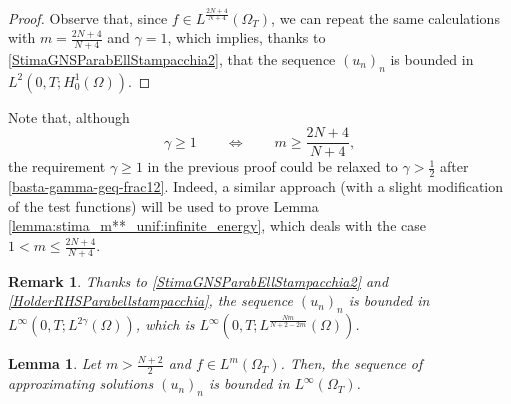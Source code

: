 \documentclass{amsart}
\numberwithin{equation}{section}
\newtheorem{lemma}[example]{Lemma}
\newtheorem{remark}[example]{Remark}
\def\elle#1{L^{#1}}
\def\elleom#1{L^{#1}(\Omega)}
\def\elleomT#1{L^{#1}(\Omega_T)}
\def\Hom{H^1_0(\Omega)}
\begin{document}
\begin{proof}
    Observe that, since $f\in\elleomT{\frac{2N+4}{N+4}}$, we can repeat the same calculations with
    $m=\frac{2N+4}{N+4}$ and $\gamma=1$, which implies, thanks to \eqref{StimaGNSParabEllStampacchia2}, that the sequence $(u_n)_n$ is bounded in $\elle2(0,T;\Hom)$.
\end{proof}

Note that, although
\begin{equation}\label{gamma1-parabell}
    \gamma\geq1\qquad\Longleftrightarrow\qquad m\geq\frac{2N+4}{N+4},
\end{equation}
the requirement $\gamma\geq1$ in the previous proof could be relaxed to $\gamma>\frac{1}{2}$ after \eqref{basta-gamma-geq-frac12}. Indeed, a similar approach (with a slight modification of the test functions) will be used to prove Lemma \ref{lemma:stima_m**_unif:infinite_energy}, which deals with the case $1<m\leq\frac{2N+4}{N+4}$. 

\begin{remark}
    Thanks to \eqref{StimaGNSParabEllStampacchia2} and \eqref{HolderRHSParabellstampacchia}, the sequence $(u_n)_n$ is bounded in $\elle\infty(0,T;\elleom {2\gamma})$, which is $\elle\infty(0,T;\elleom{\frac{Nm}{N+2-2m}})$. 
\end{remark}

\begin{lemma}\label{lemma:stima_Linfty_unif}
    Let $m>\frac{N+2}{2}$ and $f\in\elle m (\Omega_T)$. Then, the sequence of approximating solutions $(u_n)_n$ is bounded in $\elleomT {\infty}$.
\end{lemma}
\end{document}
